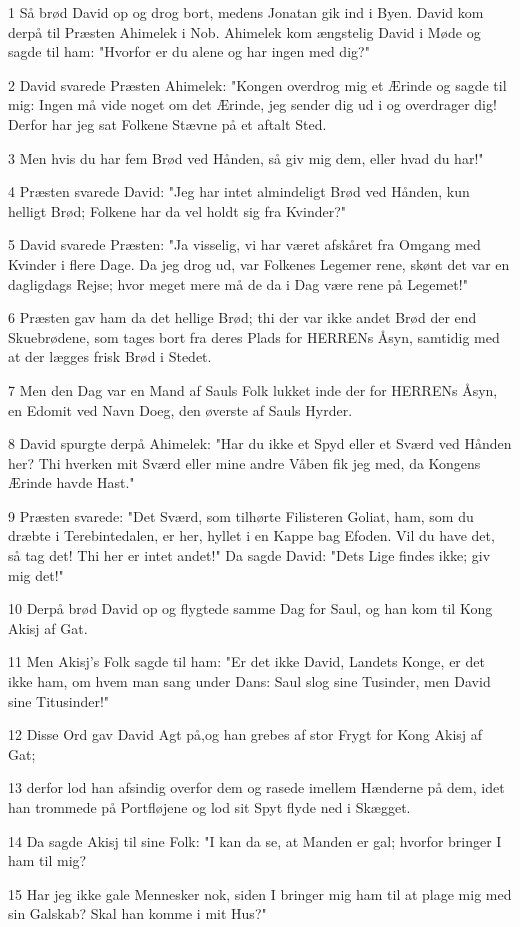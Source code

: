 \par 1 Så brød David op og drog bort, medens Jonatan gik ind i Byen. David kom derpå til Præsten Ahimelek i Nob. Ahimelek kom ængstelig David i Møde og sagde til ham: "Hvorfor er du alene og har ingen med dig?"
\par 2 David svarede Præsten Ahimelek: "Kongen overdrog mig et Ærinde og sagde til mig: Ingen må vide noget om det Ærinde, jeg sender dig ud i og overdrager dig! Derfor har jeg sat Folkene Stævne på et aftalt Sted.
\par 3 Men hvis du har fem Brød ved Hånden, så giv mig dem, eller hvad du har!"
\par 4 Præsten svarede David: "Jeg har intet almindeligt Brød ved Hånden, kun helligt Brød; Folkene har da vel holdt sig fra Kvinder?"
\par 5 David svarede Præsten: "Ja visselig, vi har været afskåret fra Omgang med Kvinder i flere Dage. Da jeg drog ud, var Folkenes Legemer rene, skønt det var en dagligdags Rejse; hvor meget mere må de da i Dag være rene på Legemet!"
\par 6 Præsten gav ham da det hellige Brød; thi der var ikke andet Brød der end Skuebrødene, som tages bort fra deres Plads for HERRENs Åsyn, samtidig med at der lægges frisk Brød i Stedet.
\par 7 Men den Dag var en Mand af Sauls Folk lukket inde der for HERRENs Åsyn, en Edomit ved Navn Doeg, den øverste af Sauls Hyrder.
\par 8 David spurgte derpå Ahimelek: "Har du ikke et Spyd eller et Sværd ved Hånden her? Thi hverken mit Sværd eller mine andre Våben fik jeg med, da Kongens Ærinde havde Hast."
\par 9 Præsten svarede: "Det Sværd, som tilhørte Filisteren Goliat, ham, som du dræbte i Terebintedalen, er her, hyllet i en Kappe bag Efoden. Vil du have det, så tag det! Thi her er intet andet!" Da sagde David: "Dets Lige findes ikke; giv mig det!"
\par 10 Derpå brød David op og flygtede samme Dag for Saul, og han kom til Kong Akisj af Gat.
\par 11 Men Akisj's Folk sagde til ham: "Er det ikke David, Landets Konge, er det ikke ham, om hvem man sang under Dans: Saul slog sine Tusinder, men David sine Titusinder!"
\par 12 Disse Ord gav David Agt på,og han grebes af stor Frygt for Kong Akisj af Gat;
\par 13 derfor lod han afsindig overfor dem og rasede imellem Hænderne på dem, idet han trommede på Portfløjene og lod sit Spyt flyde ned i Skægget.
\par 14 Da sagde Akisj til sine Folk: "I kan da se, at Manden er gal; hvorfor bringer I ham til mig?
\par 15 Har jeg ikke gale Mennesker nok, siden I bringer mig ham til at plage mig med sin Galskab? Skal han komme i mit Hus?"

